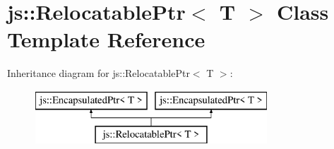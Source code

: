 \hypertarget{classjs_1_1_relocatable_ptr}{\section{js\-:\-:Relocatable\-Ptr$<$ T $>$ Class Template Reference}
\label{classjs_1_1_relocatable_ptr}
}
Inheritance diagram for js\-:\-:Relocatable\-Ptr$<$ T $>$\-:\begin{figure}[H]
\begin{center}
\leavevmode
\includegraphics[height=2.000000cm]{classjs_1_1_relocatable_ptr}
\end{center}
\end{figure}
